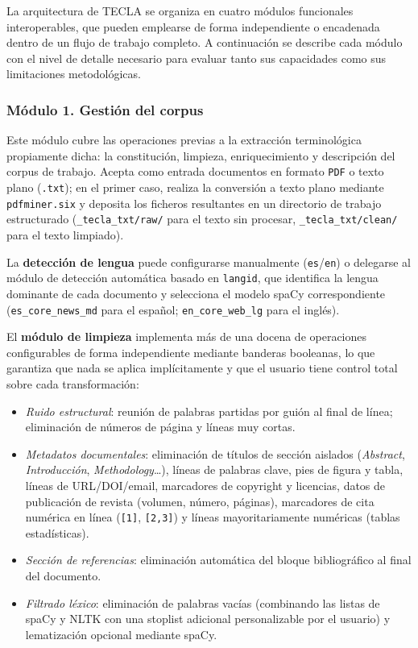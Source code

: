 La arquitectura de TECLA se organiza en cuatro módulos funcionales interoperables, que pueden emplearse de forma independiente o encadenada dentro de un flujo de trabajo completo. A continuación se describe cada módulo con el nivel de detalle necesario para evaluar tanto sus capacidades como sus limitaciones metodológicas.

\subsubsection*{Módulo 1. Gestión del corpus}

Este módulo cubre las operaciones previas a la extracción terminológica propiamente dicha: la constitución, limpieza, enriquecimiento y descripción del corpus de trabajo. Acepta como entrada documentos en formato \texttt{PDF} o texto plano (\texttt{.txt}); en el primer caso, realiza la conversión a texto plano mediante \texttt{pdfminer.six} y deposita los ficheros resultantes en un directorio de trabajo estructurado (\texttt{\_tecla\_txt/raw/} para el texto sin procesar, \texttt{\_tecla\_txt/clean/} para el texto limpiado).

La \textbf{detección de lengua} puede configurarse manualmente (\texttt{es}/\texttt{en}) o delegarse al módulo de detección automática basado en \texttt{langid}, que identifica la lengua dominante de cada documento y selecciona el modelo spaCy correspondiente (\texttt{es\_core\_news\_md} para el español; \texttt{en\_core\_web\_lg} para el inglés).

El \textbf{módulo de limpieza} implementa más de una docena de operaciones configurables de forma independiente mediante banderas booleanas, lo que garantiza que nada se aplica implícitamente y que el usuario tiene control total sobre cada transformación:

\begin{itemize}
    \item \textit{Ruido estructural}: reunión de palabras partidas por guión al final de línea; eliminación de números de página y líneas muy cortas.
    \item \textit{Metadatos documentales}: eliminación de títulos de sección aislados (\textit{Abstract}, \textit{Introducción}, \textit{Methodology}…), líneas de palabras clave, pies de figura y tabla, líneas de URL/DOI/email, marcadores de copyright y licencias, datos de publicación de revista (volumen, número, páginas), marcadores de cita numérica en línea (\texttt{[1]}, \texttt{[2,3]}) y líneas mayoritariamente numéricas (tablas estadísticas).
    \item \textit{Sección de referencias}: eliminación automática del bloque bibliográfico al final del documento.
    \item \textit{Filtrado léxico}: eliminación de palabras vacías (combinando las listas de spaCy y NLTK con una stoplist adicional personalizable por el usuario) y lematización opcional mediante spaCy.
\end{itemize}

